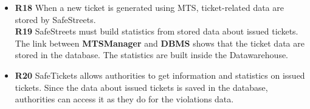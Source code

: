 \documentclass[./main.tex]{subfiles}
\begin{document}

\begin{itemize}
\item
  \textbf{R18} When a new ticket is generated using MTS, ticket-related
  data are stored by SafeStreets.\\
  \textbf{R19} SafeStreets must build statistics from stored data about
  issued tickets.
  \subitem
    The link between \textbf{MTSManager} and \textbf{DBMS} shows that the ticket data are stored in the database. The statistics are built inside the Datawarehouse.

\item
  \textbf{R20} SafeTickets allows authorities to get information and
  statistics on issued tickets.
  \subitem
    Since the data about issued tickets is saved in the database, authorities can access it as they do for the violations data.
\end{itemize}
\end{document}
